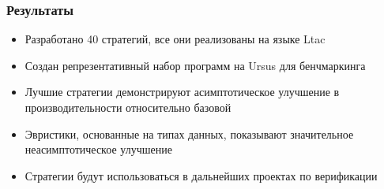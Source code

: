 \documentclass{beamer}
\begin{document}
\begin{frame}\frametitle{Результаты}
\begin{itemize}
    \item Разработано 40 стратегий, все они реализованы на языке Ltac
    \item Создан репрезентативный набор программ на Ursus для бенчмаркинга
    \item Лучшие стратегии демонстрируют асимптотическое улучшение в производительности относительно базовой
    \item Эвристики, основанные на типах данных, показывают значительное неасимптотическое улучшение
    \item Стратегии будут использоваться в дальнейших проектах по верификации
\end{itemize}
\end{frame}
\end{document}
